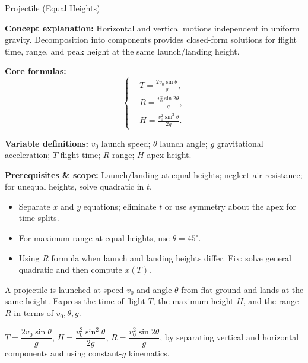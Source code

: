 \begin{KnowledgePoint}{Projectile (Equal Heights) \Core}
  \KPFormulas
  \begin{formulabox}
  \textbf{Concept explanation:} Horizontal and vertical motions independent in uniform gravity. Decomposition into components provides closed-form solutions for flight time, range, and peak height at the same launch/landing height.

  \textbf{Core formulas:}
  \[
  \left\{\begin{aligned}
    &T=\frac{2v_0\sin\theta}{g},\\
    &R=\frac{v_0^2\sin2\theta}{g},\\
    &H=\frac{v_0^2\sin^2\theta}{2g}.
  \end{aligned}\right.
  \]

  \textbf{Variable definitions:} $v_0$ launch speed; $\theta$ launch angle; $g$ gravitational acceleration; $T$ flight time; $R$ range; $H$ apex height.

  \textbf{Prerequisites \& scope:} Launch/landing at equal heights; neglect air resistance; for unequal heights, solve quadratic in $t$.
  \end{formulabox}

  \KPHeuristics
  \begin{heuristicsbox}
  \begin{itemize}[leftmargin=*]
    \item Separate $x$ and $y$ equations; eliminate $t$ or use symmetry about the apex for time splits.
    \item For maximum range at equal heights, use $\theta=45^\circ$.
  \end{itemize}
  \vspace{0.4em}
  \begin{itemize}[leftmargin=*]
    \item Using $R$ formula when launch and landing heights differ. Fix: solve general quadratic and then compute $x(T)$.
  \end{itemize}
  \end{heuristicsbox}

  \KPProblems
  \begin{cheatproblem}
  A projectile is launched at speed $v_0$ and angle $\theta$ from flat ground and lands at the same height. Express the time of flight $T$, the maximum height $H$, and the range $R$ in terms of $v_0,\theta,g$.
  \begin{solutionbox}
  $T=\dfrac{2v_0\sin\theta}{g}$, $H=\dfrac{v_0^2\sin^2\theta}{2g}$, $R=\dfrac{v_0^2\sin2\theta}{g}$, by separating vertical and horizontal components and using constant-$g$ kinematics.
  \end{solutionbox}
  \end{cheatproblem}


\end{KnowledgePoint}
